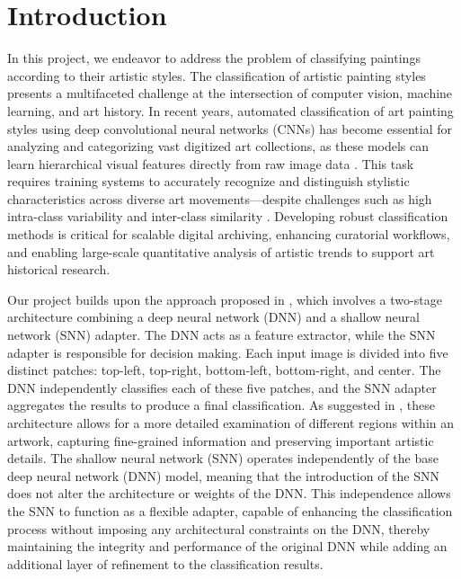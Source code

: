 \section{Introduction}
In this project, we endeavor to address the problem of classifying paintings according to their artistic styles. The classification of artistic painting styles presents a multifaceted challenge at the intersection of computer vision, machine learning, and art history\cite{CETINIC2018107}. 
In recent years, automated classification of art painting styles using deep convolutional neural networks (CNNs) has become essential for analyzing and categorizing vast digitized art collections, as these models can learn hierarchical visual features directly from raw image data \cite{li2025enhanced}\cite{imran2023artistic}. 
This task requires training systems to accurately recognize and distinguish stylistic characteristics across diverse art movements—despite challenges such as high intra-class variability and inter-class similarity \cite{alkofer2021using}. 
Developing robust classification methods is critical for scalable digital archiving, enhancing curatorial workflows, and enabling large-scale quantitative analysis of artistic trends to support art historical research.

Our project builds upon the approach proposed in \cite{imran2023artistic}, which involves a two-stage architecture combining a deep neural network (DNN) and a shallow neural network (SNN) adapter. The DNN acts as a feature extractor, while the SNN adapter is responsible for decision making. Each input image is divided into five 
distinct patches: top-left, top-right, bottom-left, bottom-right, and center. The DNN independently classifies each of these five patches, and the SNN adapter aggregates the results to produce a final classification. As suggested in \cite{imran2023artistic}, these architecture allows for a more detailed examination of different regions within an artwork, capturing
fine-grained information and preserving important artistic details. The shallow neural network (SNN) operates independently of the base deep neural network (DNN) model, meaning that the introduction of the SNN does not alter the architecture or weights of the DNN. This independence allows the SNN to function as a flexible adapter, capable of enhancing the classification process without imposing any architectural constraints on the DNN, thereby maintaining the integrity and performance of the original DNN while adding an additional layer of refinement to the classification results.